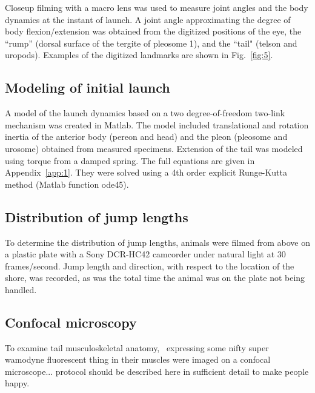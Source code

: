 \documentclass{jeb}
\newcommand{\Parhyalehawaiensis}{\Genus{Parhyale hawaiensis}}
\begin{document}
Closeup filming with a macro lens was used to measure joint angles and the body dynamics at the instant of launch.  A joint angle approximating the degree of body flexion/extension was obtained from the digitized positions of the eye, the ``rump'' (dorsal surface of the tergite of pleosome 1), and the ``tail" (telson and uropods).  Examples of the digitized landmarks are shown in Fig.~\ref{fig:5}.


\subsection{Modeling of initial launch}
	A model of the launch dynamics based on a two degree-of-freedom two-link mechanism was created in Matlab.  The model included translational and rotation inertia of the anterior body (pereon and head) and the pleon (pleosome and urosome) obtained from measured specimens.  Extension of the tail was modeled using torque from a damped spring.  The full equations are given in Appendix~\ref{app:1}.  They were solved using a 4th order explicit Runge-Kutta method (Matlab function ode45). 

\subsection{Distribution of jump lengths}
	To determine the distribution of jump lengths, animals were filmed from above on a plastic plate with a Sony DCR-HC42 camcorder under natural light at 30 frames/second.  Jump length and direction, with respect to the location of the shore, was recorded, as was the total time the animal was on the plate not being handled.

\subsection{Confocal microscopy}
	To examine tail musculoskeletal anatomy, \Parhyalehawaiensis~expressing some nifty super wamodyne fluorescent thing in their muscles were imaged on a confocal microscope... protocol should be described here in sufficient detail to make people happy. 
\end{document}
